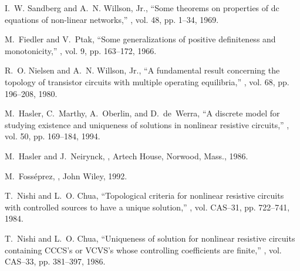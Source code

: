 \documentclass{article}
\begin{document}
%
%
\begin{thebibliography}{10}

\setlength{\itemsep}{-2pt}


I.~W. Sandberg and A.~N. {Willson, Jr.},
\newblock ``Some theorems on properties of dc equations of non-linear
  networks,''
, vol. 48, pp. 1--34, 1969.

M.~Fiedler and V.~Ptak,
\newblock ``Some generalizations of positive definiteness and monotonicity,''
, vol. 9, pp. 163--172, 1966.

R.~O. Nielsen and A.~N. {Willson, Jr.},
\newblock ``A fundamental result concerning the topology of transistor circuits
  with multiple operating equilibria,''
, vol. 68, pp. 196--208, 1980.

M.~Hasler, C.~Marthy, A.~Oberlin, and D.~de~Werra,
\newblock ``A discrete model for studying existence and uniqueness of solutions
  in nonlinear resistive circuits,''
, vol. 50, pp. 169--184, 1994.

M.~Hasler and J.~Neirynck,
,
\newblock Artech House, Norwood, Mass., 1986.

M.~Foss\'{e}prez,
,
\newblock John Wiley, 1992.

T.~Nishi and L.~O. Chua,
\newblock ``Topological criteria for nonlinear resistive circuits with
  controlled sources to have a unique solution,''
, vol. CAS--31, pp. 722--741, 1984.

T.~Nishi and L.~O. Chua,
\newblock ``Uniqueness of solution for nonlinear resistive circuits containing
  {CCCS}'s or {VCVS}'s whose controlling coefficients are finite,''
, vol. CAS--33, pp. 381--397, 1986.


\end{thebibliography}
\end{document}
